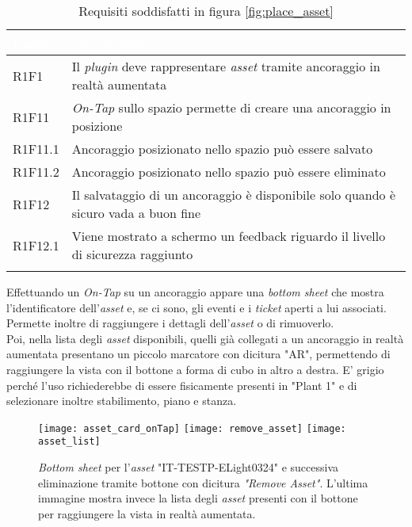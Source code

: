 {
    \setlength{\freewidth}{\dimexpr\textwidth-10\tabcolsep}
    \renewcommand{\arraystretch}{1.5}
    \centering
    \setlength{\aboverulesep}{0pt}
    \setlength{\belowrulesep}{0pt}
    \begin{longtable}{C{.15\freewidth} C{1\freewidth}}
       \toprule
    \textcolor{white}{\textbf{Codice}}&
    \textcolor{white}{\textbf{Descrizione}}\\
    \toprule
    \endhead

    R1F1 & Il \textit{plugin} deve rappresentare \textit{asset} tramite ancoraggio in realtà aumentata\\
    R1F11 & \textit{On-Tap} sullo spazio permette di creare una ancoraggio in posizione\\
    R1F11.1 & Ancoraggio posizionato nello spazio può essere salvato\\
    R1F11.2 & Ancoraggio posizionato nello spazio può essere eliminato\\
    R1F12 & Il salvataggio di un ancoraggio è disponibile solo quando è sicuro vada a buon fine\\
    R1F12.1 & Viene mostrato a schermo un feedback riguardo il livello di sicurezza raggiunto\\

    \bottomrule
    \caption{Requisiti soddisfatti in figura \ref{fig:place_asset}}
    \end{longtable}
}

Effettuando un \textit{On-Tap} su un ancoraggio appare una \textit{bottom sheet} che mostra l'identificatore dell'\textit{asset} e, se ci sono, gli eventi e i \textit{ticket} aperti a lui associati. Permette inoltre di raggiungere i dettagli dell'\textit{asset} o di rimuoverlo.\\
Poi, nella lista degli \textit{asset} disponibili, quelli già collegati a un ancoraggio in realtà aumentata presentano un piccolo marcatore con dicitura "AR", permettendo di raggiungere la vista con il bottone a forma di cubo in altro a destra. E' grigio perché l'uso richiederebbe di essere fisicamente presenti in "Plant 1" e di selezionare inoltre stabilimento, piano e stanza.

\begin{figure}[H]
  \centering
  \texttt{[image: asset\_card\_onTap]}\hfill
  \texttt{[image: remove\_asset]}\hfill
  \texttt{[image: asset\_list]}
  \caption[\textit{Bottom sheet asset} per eliminazione e lista \textit{asset}]{\textit{Bottom sheet} per l'\textit{asset} "IT-TESTP-ELight0324" e successiva eliminazione tramite bottone con dicitura \textit{"Remove Asset"}. L'ultima immagine mostra invece la lista degli \textit{asset} presenti con il bottone per raggiungere la vista in realtà aumentata.}
  \label{fig:asset_list}
\end{figure}

